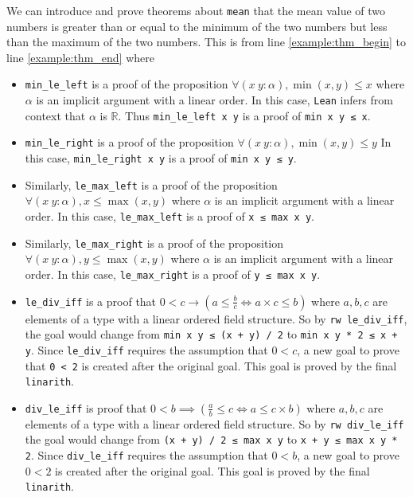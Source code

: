 \documentclass{report}
\theoremstyle{definition}
\theoremstyle{plain}
\begin{document}
We can introduce and prove theorems about {\tt \small mean} that the mean value of two numbers is greater than or equal to the minimum of the two numbers but less than the maximum of the two numbers. This is from line \ref{example:thm_begin} to line \ref{example:thm_end} where
\begin{itemize}
  \item {\tt \small min\_le\_left} is a proof of the proposition $\forall (x\ y : \alpha), \min(x, y) \le x$ where $\alpha$ is an implicit argument with a linear order. In this case, {\tt \small Lean} infers from context that $\alpha$ is $\mathbb R$. Thus {\tt \small min\_le\_left x y} is a proof of {\tt \small min x y ≤ x}.
  \item {\tt \small min\_le\_right} is a proof of the proposition $\forall (x\ y : \alpha), \min(x, y) \le y$ In this case, {\tt \small min\_le\_right x y} is a proof of {\tt \small min x y ≤ y}.
  \item Similarly, {\tt \small le\_max\_left} is a proof of the proposition $\forall (x\ y : \alpha), x \le \max(x, y)$ where $\alpha$ is an implicit argument with a linear order. In this case, {\tt \small le\_max\_left} is a proof of {\tt \small x ≤ max x y}.
  \item Similarly, {\tt \small le\_max\_right} is a proof of the proposition $\forall (x\ y : \alpha), y \le \max(x, y)$ where $\alpha$ is an implicit argument with a linear order. In this case, {\tt \small le\_max\_right} is a proof of {\tt \small y ≤ max x y}.
  \item {\tt \small le\_div\_iff} is a proof that $0 < c \to (a \le \frac{b}{c} \iff a\times c \le b)$ where $a,b,c$ are elements of a type with a linear ordered field structure. So by {\tt \small rw le\_div\_iff}, the goal would change from {\tt \small min x y ≤ (x + y) / 2} to {\tt \small min x y * 2 ≤ x + y}. Since {\tt \small le\_div\_iff} requires the assumption that $0<c$, a new goal to prove that {\tt \small 0 < 2} is created after the original goal. This goal is proved by the final {\tt \small linarith}.
  \item {\tt \small div\_le\_iff} is proof that $0 < b \implies (\frac a b \le c \iff a \le c \times b)$ where $a,b,c$ are elements of a type with a linear ordered field structure. So by {\tt \small rw div\_le\_iff} the goal would change from {\tt \small (x + y) / 2 ≤ max x y} to {\tt \small x + y ≤ max x y * 2}. Since {\tt \small div\_le\_iff} requires the assumption that $0 < b$, a new goal to prove $0 < 2$ is created after the original goal. This goal is proved by the final {\tt \small linarith}.

\end{itemize}
\end{document}
